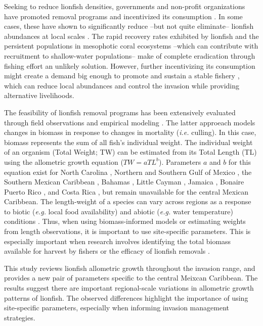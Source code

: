 \documentclass[fleqn,10pt,lineno]{wlpeerj} %
\theoremstyle{definition}
\theoremstyle{definition}
\theoremstyle{definition}
\theoremstyle{remark}
\begin{document}
Seeking to reduce lionfish densities, governments and non-profit
organizations have promoted removal programs and incentivized its
consumption \citep{chin_2016}. In some cases, these have shown to
significantly reduce --but not quite eliminate-- lionfish abundances at
local scales \citep{sandel_2015,chin_2016,deleon_2013}. The rapid
recovery rates exhibited by lionfish \citep{barbour_2011} and the
persistent populations in mesophotic coral ecosystems
\citep{andradibrown_2017} --which can contribute with recruitment to
shallow-water populations-- make of complete eradication through fishing
effort an unlikely solution. However, further incentivizing its
consumption might create a demand big enough to promote and sustain a
stable fishery \citep{chin_2016}, which can reduce local abundances and
control the invasion while providing alternative livelihoods.

The feasibility of lionfish removal programs has been extensively
evaluated through field
observations\citep{usseglio_2017,sandel_2015,chin_2016,deleon_2013} and
empirical modeling \citep{barbour_2011,morris_2011,johnston_2015}. The
latter approeach models changes in biomass in response to changes in
mortality (\emph{i.e.} culling). In this case, biomass represents the
sum of all fish's individual weight. The individual weight of an
organism (Total Weight; TW) can be estimated from its Total Length (TL)
using the allometric growth equation (\(TW = aTL^b\)). Parameters \(a\)
and \(b\) for this equation exist for North Carolina
\citep{barbour_2011}, Northern \citep{fogg_2013,dahl_2014} and Southern
Gulf of Mexico \citep{aguilarperera_2016}, the Southern Mexican
Caribbean \citep{sabidoitza_2016}, Bahamas \citep{darling_2011}, Little
Cayman \citep{edwards_2014}, Jamaica \citep{chin_2016}, Bonaire
\citep{deleon_2013} Puerto Rico \citep{toledohernndez_2014}, and Costa
Rica \citep{sandel_2015}, but remain unavailable for the central Mexican
Caribbean. The length-weight of a species can vary across regions as a
response to biotic (\emph{e.g.} local food availability) and abiotic
(\emph{e.g.} water temperature) conditions \citep{johnson_2016}. Thus,
when using biomass-informed models or estimating weights from length
observations, it is important to use site-specific parameters. This is
especially important when research involves identifying the total
biomass available for harvest by fishers \citep{chin_2016} or the
efficacy of lionfish removals
\citep{barbour_2011,morris_2011,johnston_2015}.

This study reviews lionfish allometric growth throughout the invasion
range, and provides a new pair of parameters specific to the central
Meixcan Caribbean. The results suggest there are important
regional-scale variations in allometric growth patterns of lionfish. The
observed differences highlight the importance of using site-specific
parameters, especially when informing invasion management strategies.
\end{document}
